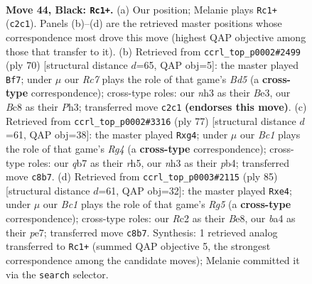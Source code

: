 \documentclass[11pt]{article}
\begin{document}
\clearpage

\begin{figure}[p]\centering
\begin{subfigure}{0.46\textwidth}\centering
\resizebox{\linewidth}{!}{%
\newchessgame
\chessboard[
  setfen={2b3k1/1Q3p1p/6p1/4Pp2/B4P2/7N/P1r3PP/1n2K3 b - - 0 44},
  showmover=false,
  pgfstyle=straightmove, color=movearrow, markmove={c2-c1}
]}
\caption{}
\end{subfigure}\hfill
\begin{subfigure}{0.46\textwidth}\centering
\resizebox{\linewidth}{!}{%
\newchessgame
\chessboard[
  setfen={2q4k/pp2R2p/1n4p1/3BP3/8/4B2P/P5P1/6K1 w - - 5 36},
  showmover=false,
  pgfstyle=straightmove, color=movearrow, markmove={d5-f7}
]}
\caption{}
\end{subfigure}
\\[4pt]
\begin{subfigure}{0.46\textwidth}\centering
\resizebox{\linewidth}{!}{%
\newchessgame
\chessboard[
  setfen={k7/1p6/p1p5/2P1p1rR/1P1p2Q1/P7/2P2P2/2K5 b - - 0 39},
  showmover=false,
  pgfstyle=straightmove, color=movearrow, markmove={g5-g4}
]}
\caption{}
\end{subfigure}\hfill
\begin{subfigure}{0.46\textwidth}\centering
\resizebox{\linewidth}{!}{%
\newchessgame
\chessboard[
  setfen={4b3/4P2k/p5pp/P4p2/1p2Q1rP/8/1P1R1BPK/8 b - - 0 43},
  showmover=false,
  pgfstyle=straightmove, color=movearrow, markmove={g4-e4}
]}
\caption{}
\end{subfigure}
\caption{\textbf{Move 44, Black: \texttt{Rc1+}.} (a) Our position; Melanie plays \texttt{Rc1+} (\texttt{c2c1}). Panels (b)--(d) are the retrieved master positions whose correspondence most drove this move (highest QAP objective among those that transfer to it). (b) Retrieved from \texttt{ccrl\_top\_p0002\#2499} (ply 70) [structural distance $d$=65, QAP obj=5]: the master played \texttt{Bf7}; under $\mu$ our \emph{Rc7} plays the role of that game's \emph{Bd5} (a \textbf{cross-type} correspondence); cross-type roles: our \emph{n}h3 as their \emph{B}e3, our \emph{B}c8 as their \emph{P}h3; transferred move \texttt{c2c1} \textbf{(endorses this move)}. (c) Retrieved from \texttt{ccrl\_top\_p0002\#3316} (ply 77) [structural distance $d$=61, QAP obj=38]: the master played \texttt{Rxg4}; under $\mu$ our \emph{Bc1} plays the role of that game's \emph{Rg4} (a \textbf{cross-type} correspondence); cross-type roles: our \emph{q}b7 as their \emph{r}h5, our \emph{n}h3 as their \emph{p}b4; transferred move \texttt{c8b7}. (d) Retrieved from \texttt{ccrl\_top\_p0003\#2115} (ply 85) [structural distance $d$=61, QAP obj=32]: the master played \texttt{Rxe4}; under $\mu$ our \emph{Bc1} plays the role of that game's \emph{Rg5} (a \textbf{cross-type} correspondence); cross-type roles: our \emph{R}c2 as their \emph{B}e8, our \emph{b}a4 as their \emph{p}e7; transferred move \texttt{c8b7}. Synthesis: 1 retrieved analog transferred to \texttt{Rc1+} (summed QAP objective 5, the strongest correspondence among the candidate moves); Melanie committed it via the \texttt{search} selector.}
\label{fig:thought-m87}
\end{figure}
\end{document}
